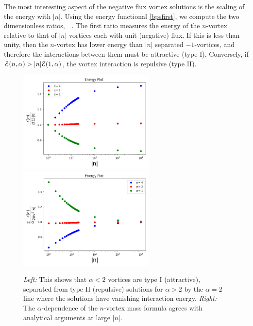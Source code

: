 The most interesting aspect of the negative flux vortex solutions is the scaling of the energy with $|n|$. Using the energy functional \eqref{bpsfirst}, we compute the two dimensionless ratios,
\be
{}\, \qquad {} \quad{} \quad{}\,.\label{ratios}
\ee
The first ratio measures the energy of the $n$-vortex relative to that of $|n|$ vortices each with unit (negative) flux. If this is less than unity, then the $n$-vortex has lower energy than $|n|$ separated $-1$-vortices, and therefore the interactions between them must be attractive (type I). Conversely, if ${\cal E}(n, \alpha) > |n|{\cal E}(1, \alpha)$, the vortex interaction is repulsive (type II). 
\begin{figure}[H]
\begin{center}
 \includegraphics[width=2.70in]{Chapter_2_Folder_1912.11321/figures/bpsrationeg.png}\hspace{0.1in}
    \includegraphics[width=2.70in]{Chapter_2_Folder_1912.11321/figures/mass1neg.png}
    \caption[This figure shows the energy per flux for different values of the coupling parameter $\alpha$.]{{\small{\it Left:} This shows that $\alpha < 2$ vortices are type I (attractive), separated from type II (repulsive) solutions for $\alpha>2$ by the $\alpha=2$ line where the solutions have vanishing interaction energy. {\it Right:} The $\alpha$-dependence of the $n$-vortex mass formula agrees with analytical arguments at large $|n|$. }} \label{fig:massn1}
   \end{center}
\end{figure}
